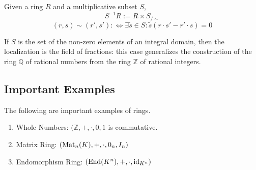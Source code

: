 \begin{definition}[Localization]
   Given a ring \(R\) and a multiplicative subset \(S\),
   \[S^{-1}R := R \times S_{/\sim}\]
   \[(r, s) \sim (r', s') :\iff \exists \tilde{s} \in S: \tilde{s}(r\cdot s' - r'\cdot s) = 0\]
\end{definition}
\begin{example}
   If \(S\) is the set of the non-zero elements of an integral domain, then the localization is the field of fractions: this case generalizes the construction of the ring \(\mathbb{Q}\) of rational numbers from the ring \(\mathbb{Z}\) of rational integers.
\end{example}

\subsection{Important Examples}
\begin{proposition}
   The following are important examples of rings.
   \begin{enumerate}[label=\roman*, align=Center]
      \item Whole Numbers: \((\mathbb{Z}, +, \cdot, 0, 1\) is commutative.
      \item Matrix Ring: \((\operatorname{Mat}_n(K), +, \cdot, 0_n, I_n)\)
      \item Endomorphism Ring: \((\operatorname{End}(K^n), +, \cdot, \operatorname{id}_{K^n})\)
   \end{enumerate}
\end{proposition}
